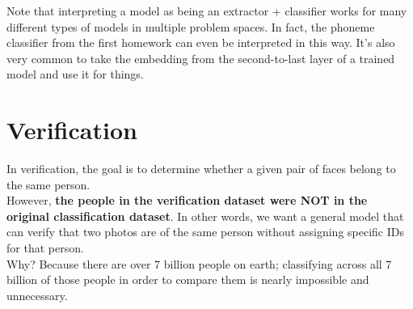 \documentclass{article}
\begin{document}



Note that interpreting a model as being an extractor + classifier works for many different types of models in multiple problem spaces. In fact, the phoneme classifier from the first homework can even be interpreted in this way. It's also very common to take the embedding from the second-to-last layer of a trained model and use it for things.

\newpage{}

\section{Verification}
In verification, the goal is to determine whether a given pair of faces belong to the same person. \\

However, \textbf{the people in the verification dataset were NOT in the original classification dataset}. In other words, we want a general model that can verify that two photos are of the same person without assigning specific IDs for that person. \\

Why? Because there are over 7 billion people on earth; classifying across all 7 billion of those people in order to compare them is nearly impossible and unnecessary.\\
\end{document}
